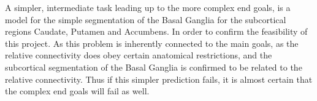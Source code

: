 A simpler, intermediate task leading up to the more complex end goals, is a model for the simple segmentation of the Basal Ganglia for the subcortical regions Caudate, Putamen and Accumbens. In order to confirm the feasibility of this project. As this problem is inherently connected to the main goals, as the relative connectivity does obey certain anatomical restrictions, and the subcortical segmentation of the Basal Ganglia is confirmed to be related to the relative connectivity. Thus if this simpler prediction fails, it is almost certain that the complex end goals will fail as well.


